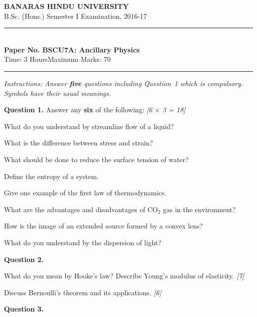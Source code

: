 \documentclass[11pt,a4paper]{article}
\newcommand{\pts}[1]{\hfill   \textit{[#1]}}
\begin{document}
\begin{center}
  {\large\bfseries BANARAS HINDU UNIVERSITY}\\[2pt]
  {\normalsize B.Sc. (Hons.) Semester I Examination, 2016-17}\\[6pt]
  \rule{0.8\linewidth}{0.5pt}\\[6pt]
  {\large\bfseries Paper No. BSCU7A: Ancillary Physics}\\[4pt]
  {\normalsize Time: 3 Hours\hfill Maximum Marks: 70}
\end{center}
\rule{\linewidth}{0.4pt}
\smallskip



\noindent   \textit{Instructions: Answer   \textbf{five} questions including Question~1 which is compulsory. Symbols have their usual meanings.}
\bigskip




\noindent   \textbf{Question 1.} Answer any   \textbf{six} of the following: \pts{6 $ \times$ 3 = 18}

\begin{parts}
  \item What do you understand by streamline flow of a liquid?
  \item What is the difference between stress and strain?
  \item What should be done to reduce the surface tension of water?
  \item Define the entropy of a system.
  \item Give one example of the first law of thermodynamics.
  \item What are the advantages and disadvantages of $ \text{CO}_2$ gas in the environment?
  \item How is the image of an extended source formed by a convex lens?
  \item What do you understand by the dispersion of light?
\end{parts}

\medskip


\noindent   \textbf{Question 2.}

\begin{parts}
  \item What do you mean by Hooke's law? Describe Young's modulus of elasticity. \pts{7}
  \item Discuss Bernoulli's theorem and its applications. \pts{6}
\end{parts}

\medskip


\noindent   \textbf{Question 3.}
\end{document}
